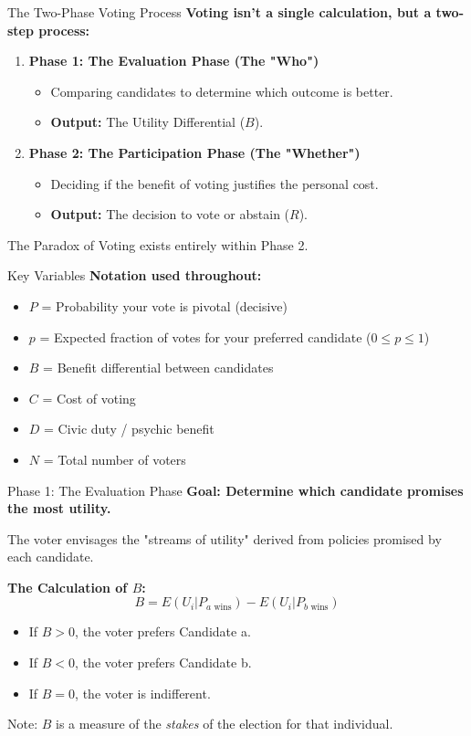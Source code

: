 \documentclass[10pt]{beamer}
\begin{document}
\begin{frame}{The Two-Phase Voting Process}
\textbf{Voting isn't a single calculation, but a two-step process:}

   
\begin{enumerate}
\item \textbf{Phase 1: The Evaluation Phase (The "Who")}
\begin{itemize}
\item Comparing candidates to determine which outcome is better.
\item \textbf{Output:} The Utility Differential ($B$).
\end{itemize}

   
\item \textbf{Phase 2: The Participation Phase (The "Whether")}
\begin{itemize}
\item Deciding if the benefit of voting justifies the personal cost.
\item \textbf{Output:} The decision to vote or abstain ($R$).
\end{itemize}
\end{enumerate}

   
\alert{The Paradox of Voting exists entirely within Phase 2.}
\end{frame}

\begin{frame}{Key Variables}
\textbf{Notation used throughout:}
\begin{itemize}
\item $P$ = Probability your vote is \alert{pivotal} (decisive)
\item $p$ = Expected fraction of votes for your preferred candidate ($0 \le p \le 1$)
\item $B$ = Benefit differential between candidates
\item $C$ = Cost of voting
\item $D$ = Civic duty / psychic benefit
\item $N$ = Total number of voters
\end{itemize}
\end{frame}

\begin{frame}{Phase 1: The Evaluation Phase}
\textbf{Goal: Determine which candidate promises the most utility.}


The voter envisages the "streams of utility" derived from policies promised by each candidate.

   
\textbf{The Calculation of $B$:}
\[ B = E(U_i | P_{a\text{ wins}}) - E(U_i | P_{b\text{ wins}}) \]

   
\begin{itemize}
\item If $B > 0$, the voter prefers Candidate a.
\item If $B < 0$, the voter prefers Candidate b.
\item If $B = 0$, the voter is indifferent.
\end{itemize}


\footnotesize{Note: $B$ is a measure of the \emph{stakes} of the election for that individual.}
\end{frame}
\end{document}
